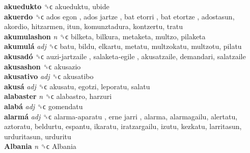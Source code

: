 \textbf{akuedukto} ␝ϲ  akueduktu, ubide  \\
\textbf{akuerdo} ␝ϲ   ados egon ,  ados jartze ,  bat etorri ,  bat etortze , adostasun, akordio, hitzarmen, itun, komunztadura, kontzertu, tratu  \\
\textbf{akumulashon} \emph{n}  ␝ϲ  bilketa, bilkura, metaketa, multzo, pilaketa  \\
\textbf{akumulá} \emph{adj}  ␝ϲ  batu, bildu, elkartu, metatu, multzokatu, multzotu, pilatu  \\
\textbf{akusadó} ␝ϲ   auzi-jartzaile ,  salaketa-egile , akusatzaile, demandari, salatzaile  \\
\textbf{akusashon} ␝ϲ  akusazio  \\
\textbf{akusativo} \emph{adj}  ␝ϲ  akusatibo  \\
\textbf{akusá} \emph{adj}  ␝ϲ  akusatu, egotzi, leporatu, salatu  \\
\textbf{alabaster} \emph{n}  ␝ϲ  alabastro, harzuri  \\
\textbf{alabá} \emph{adj}  ␝ϲ  gomendatu  \\
\textbf{alarmá} \emph{adj}  ␝ϲ   alarma-aparatu ,  erne jarri , alarma, alarmagailu, alertatu, aztoratu, beldurtu, espantu, ikaratu, iratzargailu, izutu, kezkatu, larritasun, urduritasun, urduritu  \\
\textbf{Albania} \emph{n}  ␝ϲ   Albania   \\
